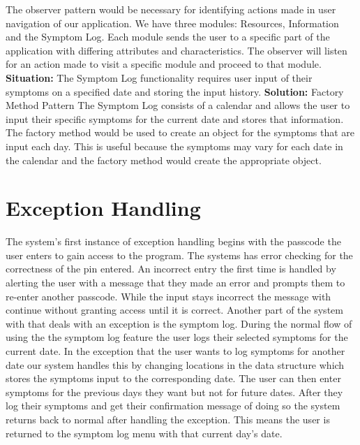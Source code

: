 \documentclass[letterpaper,12pt,titlepage]{article}
\begin{document}
\noindent
The observer pattern would be necessary for identifying actions made in user navigation of our application. We have three modules: Resources, Information and the Symptom Log. Each module sends the user to a specific part of the application with differing attributes and characteristics. The observer will listen for an action made to visit a specific module and proceed to that module.
\newline
\newline
\noindent
\textbf{Situation: }The Symptom Log functionality requires user input of their symptoms on a specified date and storing the input history.
\noindent
\newline
\newline
\textbf{Solution: }Factory Method Pattern
\noindent
\newline
\newline
The Symptom Log consists of a calendar and allows the user to input their specific symptoms for the current date and stores that information. The factory method would be used to create an object for the symptoms that are input each day. This is useful because the symptoms may vary for each date in the calendar and the factory method would create the appropriate object.

\section{Exception Handling}
The system’s first instance of exception handling begins with the passcode the user enters to gain access to the program. The systems has error checking for the correctness of the pin entered. An incorrect entry the first time is handled by alerting the user with a message that they made an error and prompts them to re-enter another passcode. While the input stays incorrect the message with continue without granting access until it is correct. 
\newline
\newline
Another part of the system with that deals with an exception is the symptom log. During the normal flow of using the the symptom log feature the user logs their selected symptoms for the current date. In the exception that the user wants to log symptoms for another date our system handles this by changing locations in the data structure which stores the symptoms input to the corresponding date. The user can then enter symptoms for the previous days they want but not for future dates. After they log their symptoms and get their confirmation message of doing so the system returns back to normal after handling the exception. This means the user is returned to the symptom log menu with that current day’s date. 
\end{document}
